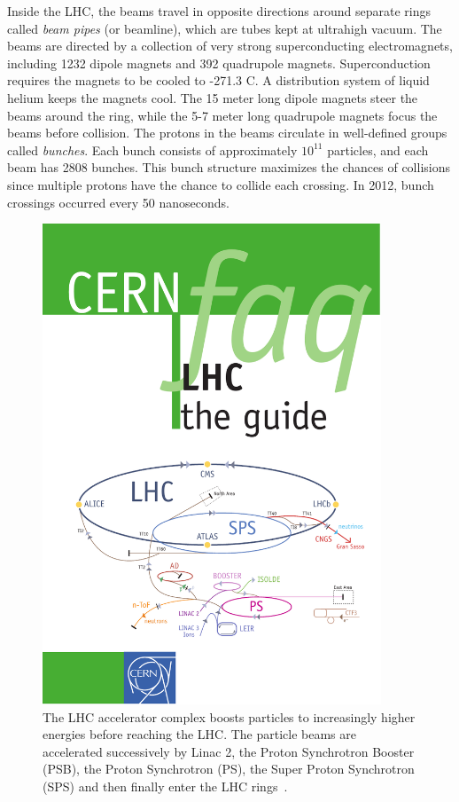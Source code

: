 Inside the LHC, the beams travel in opposite directions around separate rings called \emph{beam pipes} (or beamline), which are tubes kept at ultrahigh vacuum. The beams are directed by a collection of very strong superconducting electromagnets, including 1232 dipole magnets and 392 quadrupole magnets. Superconduction requires the magnets to be cooled to -271.3 C. A distribution system of liquid helium keeps the magnets cool. The 15 meter long dipole magnets steer the beams around the ring, while the 5-7 meter long quadrupole magnets focus the beams before collision. The protons in the beams circulate in well-defined groups called \textit{bunches}. Each bunch consists of approximately $10^{11}$ particles, and each beam has 2808 bunches. This bunch structure maximizes the chances of collisions since multiple protons have the chance to collide each crossing. In 2012, bunch crossings occurred every 50 nanoseconds.




\begin{figure}[tp]
  \centering
  \includegraphics[width=0.90\textwidth]{fig/atlas/accel-chain.pdf}
  \caption{The LHC accelerator complex boosts particles to increasingly higher energies before reaching the LHC. The particle beams are accelerated successively by Linac 2, the Proton Synchrotron Booster (PSB), the Proton Synchrotron (PS), the Super Proton Synchrotron (SPS) and then finally enter the LHC rings~\cite{cern-faq}.}
  \label{fig:lhc-chain}
\end{figure}
